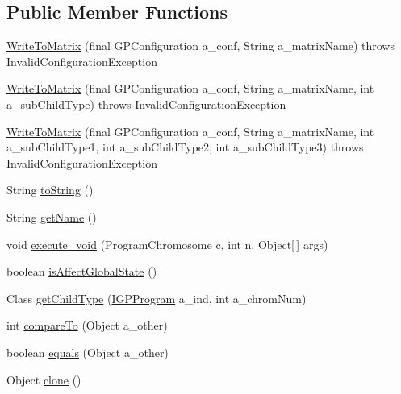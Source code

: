 \subsection*{Public Member Functions}
\begin{DoxyCompactItemize}
\item 
\hyperlink{classorg_1_1jgap_1_1gp_1_1function_1_1_write_to_matrix_ac12a87a4d2c94fcd1fe8ea762c132f27}{Write\-To\-Matrix} (final G\-P\-Configuration a\-\_\-conf, String a\-\_\-matrix\-Name)  throws Invalid\-Configuration\-Exception 
\item 
\hyperlink{classorg_1_1jgap_1_1gp_1_1function_1_1_write_to_matrix_a1b6013de51625e54181b62b1bf046e79}{Write\-To\-Matrix} (final G\-P\-Configuration a\-\_\-conf, String a\-\_\-matrix\-Name, int a\-\_\-sub\-Child\-Type)  throws Invalid\-Configuration\-Exception 
\item 
\hyperlink{classorg_1_1jgap_1_1gp_1_1function_1_1_write_to_matrix_a6af6bbda71c2b75272006b27e934cd30}{Write\-To\-Matrix} (final G\-P\-Configuration a\-\_\-conf, String a\-\_\-matrix\-Name, int a\-\_\-sub\-Child\-Type1, int a\-\_\-sub\-Child\-Type2, int a\-\_\-sub\-Child\-Type3)  throws Invalid\-Configuration\-Exception 
\item 
String \hyperlink{classorg_1_1jgap_1_1gp_1_1function_1_1_write_to_matrix_a02a0627f22f9e93b7e69071b43b7ba22}{to\-String} ()
\item 
String \hyperlink{classorg_1_1jgap_1_1gp_1_1function_1_1_write_to_matrix_ae505a5510df25874e1c32151caee7a6a}{get\-Name} ()
\item 
void \hyperlink{classorg_1_1jgap_1_1gp_1_1function_1_1_write_to_matrix_a783e2a80b8268c0e6218bc718297d422}{execute\-\_\-void} (Program\-Chromosome c, int n, Object\mbox{[}$\,$\mbox{]} args)
\item 
boolean \hyperlink{classorg_1_1jgap_1_1gp_1_1function_1_1_write_to_matrix_a91727dbc706734318c29a83548084d37}{is\-Affect\-Global\-State} ()
\item 
Class \hyperlink{classorg_1_1jgap_1_1gp_1_1function_1_1_write_to_matrix_a44262529734275f02b07620b2fbf3dd2}{get\-Child\-Type} (\hyperlink{interfaceorg_1_1jgap_1_1gp_1_1_i_g_p_program}{I\-G\-P\-Program} a\-\_\-ind, int a\-\_\-chrom\-Num)
\item 
int \hyperlink{classorg_1_1jgap_1_1gp_1_1function_1_1_write_to_matrix_a1bb784e2430003f304541c36fa3959a2}{compare\-To} (Object a\-\_\-other)
\item 
boolean \hyperlink{classorg_1_1jgap_1_1gp_1_1function_1_1_write_to_matrix_ab6ea8da7364caed896eca3cd06fa6206}{equals} (Object a\-\_\-other)
\item 
Object \hyperlink{classorg_1_1jgap_1_1gp_1_1function_1_1_write_to_matrix_aefd6afdd4b445a055afbc9a9b6b4177b}{clone} ()
\end{DoxyCompactItemize}
